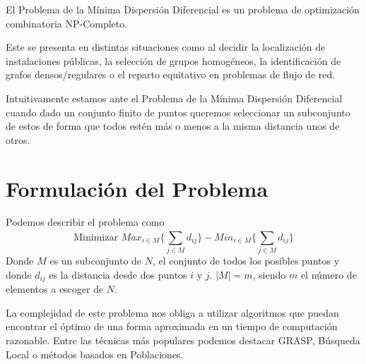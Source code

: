
El Problema de la Mínima Dispersión Diferencial es un problema de optimización combinatoria NP-Completo.\cite{Seminario2MH}

Este se presenta en distintas situaciones como al decidir la localización de instalaciones públicas,
la selección de grupos homogéneos, la identificación de grafos densos/regulares o el reparto equitativo en problemas de
flujo de red.\cite{DUARTE201546}

Intuitivamente estamos ante el Problema de la Mínima Dispersión Diferencial cuando dado un conjunto finito de puntos queremos
seleccionar un subconjunto de estos de forma que todos estén más o menos a la misma distancia unos de otros.

\section{Formulación del Problema}

Podemos describir el problema como
$$\textrm{Minimizar } Max_{i\in M}\{\sum_{j\in M}^{}d_{ij}\}-Min_{i\in M}\{\sum_{j\in M}^{}d_{ij}\} $$
Donde $M$ es un subconjunto de $N$, el conjunto de todos los posibles puntos y donde $d_{ij}$ es la distancia desde dos puntos $i$ y $j$.
$|M| = m$, siendo $m$ el número de elementos a escoger de $N$.

La complejidad de este problema nos obliga a utilizar algoritmos que puedan encontrar el óptimo de una forma aproximada en un tiempo de computación razonable.
Entre las técnicas más populares podemos destacar GRASP, Búsqueda Local o métodos basados en Poblaciones.\cite{MDP2010}